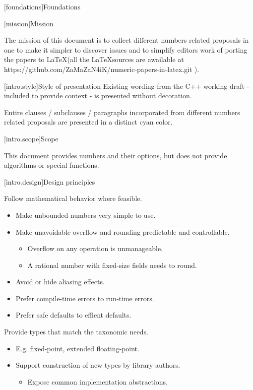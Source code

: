 
[foundations]{Foundations}

[mission]{Mission}

\iffalse %
The mission of this specification is to make numbers easier to use.
\else
The mission of this document is to collect different numbers related proposals in one to make it simpler to discover issues and to simplify editors work of porting the papers to \LaTeX (all the \LaTeX sources are awailable at https://github.com/ZaMaZaN4iK/numeric-papers-in-latex.git ).
\fi

[intro.style]{Style of presentation}
Existing wording from the C++ working draft - included to provide context - is presented without decoration.

\begin{addedblock}
Entire clauses / subclauses / paragraphs incorporated from different numbers related proposals are presented in a distinct cyan
color.
\end{addedblock}

[intro.scope]{Scope}

This document provides numbers and their options, but does not provide algorithms or special functions.

[intro.design]{Design principles}

Follow mathematical behavior where feasible.

\begin{itemize}
\item Make unbounded numbers very simple to use.
\item Make unavoidable overflow and rounding predictable and controllable.
\begin{itemize}
\item Overflow on any operation is unmanageable.
\item A rational number with fixed-size fields needs to round.
\end{itemize}
\item Avoid or hide aliasing effects.
\item Prefer compile-time errors to run-time errors.
\item Prefer safe defaults to effient defaults.
\end{itemize}

Provide types that match the taxonomic needs.

\begin{itemize}
\item E.g. fixed-point, extended floating-point.
\item Support construction of new types by library authors.
\begin{itemize}
\item Expose common implementation abstractions.
\end{itemize}	
\end{itemize}

